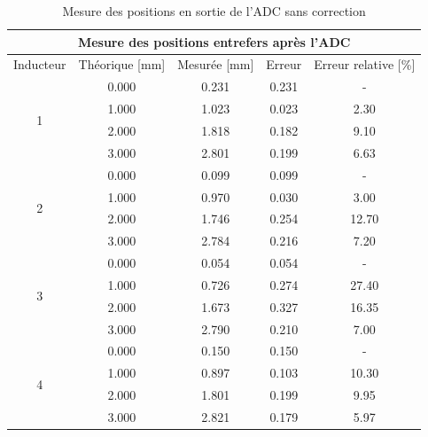 \begin{table}[H]
    \centering
    \begin{tabular}{|c|c|c|c|c|}
        \hline
        \multicolumn{5}{|c|}{\textbf{Mesure des positions entrefers après l'ADC}}                      \\ \hline
        Inducteur          & Théorique {[}mm{]} & Mesurée {[}mm{]} & Erreur & Erreur relative {[}\%{]} \\ \hline
        \multirow{4}{*}{1} & 0.000              & 0.231            & 0.231  & -                        \\ \cline{2-5}
                           & 1.000              & 1.023            & 0.023  & 2.30                     \\ \cline{2-5}
                           & 2.000              & 1.818            & 0.182  & 9.10                     \\ \cline{2-5}
                           & 3.000              & 2.801            & 0.199  & 6.63                     \\ \hline
        \multirow{4}{*}{2} & 0.000              & 0.099            & 0.099  & -                        \\ \cline{2-5}
                           & 1.000              & 0.970            & 0.030  & 3.00                     \\ \cline{2-5}
                           & 2.000              & 1.746            & 0.254  & 12.70                    \\ \cline{2-5}
                           & 3.000              & 2.784            & 0.216  & 7.20                     \\ \hline
        \multirow{4}{*}{3} & 0.000              & 0.054            & 0.054  & -                        \\ \cline{2-5}
                           & 1.000              & 0.726            & 0.274  & 27.40                    \\ \cline{2-5}
                           & 2.000              & 1.673            & 0.327  & 16.35                    \\ \cline{2-5}
                           & 3.000              & 2.790            & 0.210  & 7.00                     \\ \hline
        \multirow{4}{*}{4} & 0.000              & 0.150            & 0.150  & -                        \\ \cline{2-5}
                           & 1.000              & 0.897            & 0.103  & 10.30                    \\ \cline{2-5}
                           & 2.000              & 1.801            & 0.199  & 9.95                     \\ \cline{2-5}
                           & 3.000              & 2.821            & 0.179  & 5.97                     \\ \hline
    \end{tabular}
    \caption{Mesure des positions en sortie de l'ADC sans correction}
    \label{tab:premier_etalonnage_code_adc}
\end{table}

